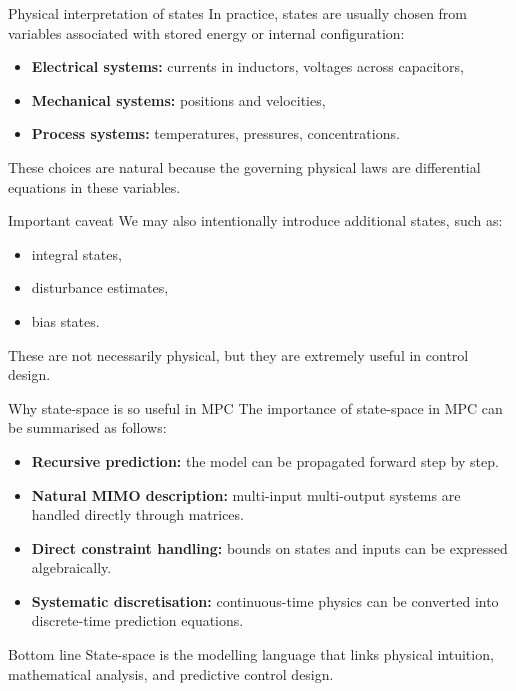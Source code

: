 \documentclass[aspectratio=169,10pt]{beamer}
\begin{document}
\begin{frame}{Physical interpretation of states}
In practice, states are usually chosen from variables associated with stored energy or internal configuration:
\begin{itemize}
  \item \textbf{Electrical systems:} currents in inductors, voltages across capacitors,
  \item \textbf{Mechanical systems:} positions and velocities,
  \item \textbf{Process systems:} temperatures, pressures, concentrations.
\end{itemize}

These choices are natural because the governing physical laws are differential equations in these variables.

\begin{notebox}{Important caveat}
We may also intentionally introduce additional states, such as:
\begin{itemize}
  \item integral states,
  \item disturbance estimates,
  \item bias states.
\end{itemize}
These are not necessarily physical, but they are extremely useful in control design.
\end{notebox}
\end{frame}

\begin{frame}{Why state-space is so useful in MPC}
The importance of state-space in MPC can be summarised as follows:
\begin{itemize}
  \item \textbf{Recursive prediction:} the model can be propagated forward step by step.
  \item \textbf{Natural MIMO description:} multi-input multi-output systems are handled directly through matrices.
  \item \textbf{Direct constraint handling:} bounds on states and inputs can be expressed algebraically.
  \item \textbf{Systematic discretisation:} continuous-time physics can be converted into discrete-time prediction equations.
\end{itemize}

\begin{alertbox}{Bottom line}
State-space is the modelling language that links physical intuition, mathematical analysis, and predictive control design.
\end{alertbox}
\end{frame}
\end{document}
